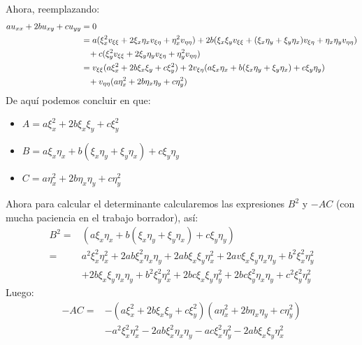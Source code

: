 \begin{homeworkProblem}
\begin{solucion}
\begin{itemize}
        \end{itemize}
        Ahora, reemplazando:
        \begin{align*}
            au_{xx}+2bu_{xy}+cu_{yy}&=0\\
            &=a(\xi_{x}^2v_{\xi\xi}+2\xi_{x}\eta_{x}v_{\xi\eta}+\eta_{x}^2v_{\eta\eta})+2b(\xi_{x}\xi_{y}v_{\xi\xi}+(\xi_{x}\eta_{y}+\xi_{y}\eta_{x})v_{\xi\eta}+\eta_{x}\eta_{y}v_{\eta\eta})\\
            &\hspace{0.3cm}+c(\xi_{y}^2v_{\xi\xi}+2\xi_{y}\eta_{y}v_{\xi\eta}+\eta_{y}^2v_{\eta\eta})\\
            &=v_{\xi\xi}(a\xi_{x}^{2}+2b\xi_{x}\xi_{y}+c\xi_{y}^{2})+2v_{\xi\eta}(a\xi_{x}\eta_{x}+b(\xi_{x}\eta_{y}+\xi_{y}\eta_{x})+c\xi_{y}\eta_{y})\\
            &\hspace{0.3cm}+v_{\eta\eta}(a\eta_{x}^{2}+2b\eta_{x}\eta_{y}+c\eta_{y}^{2})
        \end{align*}
        De aquí podemos concluir en que:
        \begin{itemize}
            \item $A=a\xi_{x}^{2}+2b\xi_{x}\xi_{y}+c\xi_{y}^{2}$
            \item $B=a\xi_{x}\eta_{x}+b(\xi_{x}\eta_{y}+\xi_{y}\eta_{x})+c\xi_{y}\eta_{y}$
            \item $C=a\eta_{x}^{2}+2b\eta_{x}\eta_{y}+c\eta_{y}^{2}$
        \end{itemize}
        Ahora para calcular el determinante calcularemos las expresiones $B^2$ y $-AC$ (con mucha paciencia en el trabajo borrador), así:
        \begin{align*}
            B^2=&(a\xi_{x}\eta_{x}+b(\xi_{x}\eta_{y}+\xi_{y}\eta_{x})+c\xi_{y}\eta_{y})\\
            =&a^2\xi_{x}^2\eta_{x}^2+2ab\xi_{x}^2\eta_{x}\eta_{y}+2ab\xi_{x}\xi_{y}\eta_{x}^2+2av\xi_{x}\xi_{y}\eta_{x}\eta_{y}+b^2\xi_{x}^2\eta_{y}^2\\
            &+2b\xi_{x}\xi_{y}\eta_{x}\eta_{y}+b^2\xi_{y}^2\eta_{x}^2+2bc\xi_{x}\xi_{y}\eta_{y}^2+2bc\xi_{y}^2\eta_{x}\eta_{y}+c^2\xi_{y}^2\eta_{y}^2
        \end{align*}
        Luego:
        \begin{align*}
            -AC=&-(a\xi_{x}^{2}+2b\xi_{x}\xi_{y}+c\xi_{y}^{2})(a\eta_{x}^{2}+2b\eta_{x}\eta_{y}+c\eta_{y}^{2})\\
            &-a^2\xi_{x}^2\eta_{x}^2-2ab\xi_{x}^2\eta_{x}\eta_{y}-ac\xi_{x}^2\eta_{y}^2-2ab\xi_{x}\xi_{y}\eta_{x}^2\\

\end{align*}
\end{solucion}
\end{homeworkProblem}
